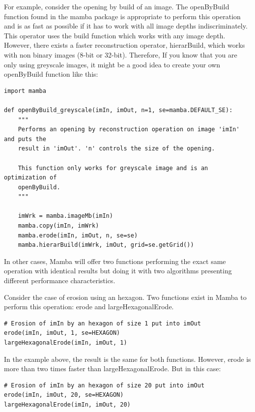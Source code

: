 \documentclass[a4paper,10pt,oneside]{article}
\begin{document}
For example, consider the opening by build of an image. The openByBuild function
found in the mamba package is appropriate to perform this operation and
is as fast as possible if it has to work with all image depths indiscriminately.
This operator uses the build function which works with any image
depth. However, there exists a faster reconstruction operator,
hierarBuild, which works with non binary images (8-bit or 32-bit). Therefore, If you know that you are
only using greyscale images, it might be a good idea to create your own openByBuild
function like this:

\lstset{language=Python}
\begin{lstlisting}
import mamba

def openByBuild_greyscale(imIn, imOut, n=1, se=mamba.DEFAULT_SE):
    """
    Performs an opening by reconstruction operation on image 'imIn' and puts the
    result in 'imOut'. 'n' controls the size of the opening.
    
    This function only works for greyscale image and is an optimization of
    openByBuild.
    """
    
    imWrk = mamba.imageMb(imIn)
    mamba.copy(imIn, imWrk)
    mamba.erode(imIn, imOut, n, se=se)
    mamba.hierarBuild(imWrk, imOut, grid=se.getGrid())
\end{lstlisting}

In other cases, Mamba will offer two functions performing the exact same 
operation with identical results but doing it with two algorithms presenting
different performance characteristics.

Consider the case of erosion using an hexagon. Two functions exist in Mamba to
perform this operation: erode and largeHexagonalErode.

\lstset{language=Python}
\begin{lstlisting}
# Erosion of imIn by an hexagon of size 1 put into imOut
erode(imIn, imOut, 1, se=HEXAGON)
largeHexagonalErode(imIn, imOut, 1)
\end{lstlisting}

In the example above, the result is the same for both functions. However, erode is
more than two times faster than largeHexagonalErode. But in this case:

\lstset{language=Python}
\begin{lstlisting}
# Erosion of imIn by an hexagon of size 20 put into imOut
erode(imIn, imOut, 20, se=HEXAGON)
largeHexagonalErode(imIn, imOut, 20)
\end{lstlisting}
\end{document}
